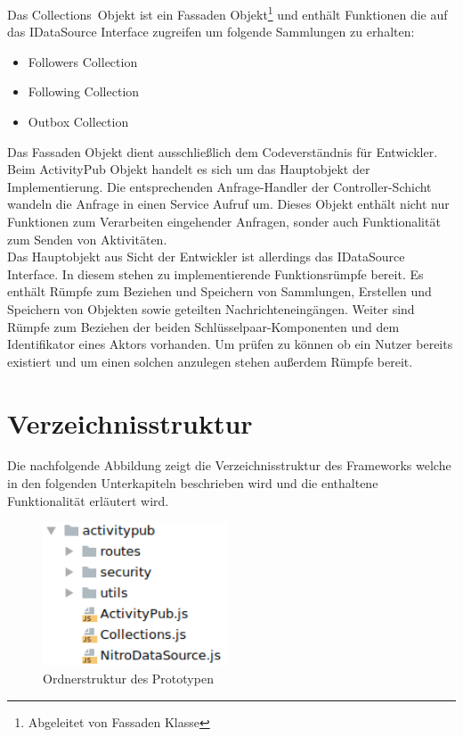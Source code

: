 Das \glqq Collections\grqq~Objekt ist ein Fassaden Objekt\footnote{Abgeleitet von Fassaden Klasse} und enthält Funktionen die auf das IDataSource Interface zugreifen um folgende Sammlungen zu erhalten:
\begin{itemize}
	\item Followers Collection
	\item Following Collection
	\item Outbox Collection
\end{itemize} 
Das Fassaden Objekt dient ausschließlich dem Codeverständnis für Entwickler.\\

Beim ActivityPub Objekt handelt es sich um das Hauptobjekt der Implementierung. Die entsprechenden Anfrage-Handler der Controller-Schicht wandeln die Anfrage in einen Service Aufruf um. Dieses Objekt enthält nicht nur Funktionen zum Verarbeiten eingehender Anfragen, sonder auch Funktionalität zum Senden von Aktivitäten.\\

Das Hauptobjekt aus Sicht der Entwickler ist allerdings das IDataSource Interface. In diesem stehen zu implementierende Funktionsrümpfe bereit. Es enthält Rümpfe zum Beziehen und Speichern von Sammlungen, Erstellen und Speichern von Objekten sowie geteilten Nachrichteneingängen. Weiter sind Rümpfe zum Beziehen der beiden Schlüsselpaar-Komponenten und dem Identifikator eines Aktors vorhanden. Um prüfen zu können ob ein Nutzer bereits existiert und um einen solchen anzulegen stehen außerdem Rümpfe bereit.

\section{Verzeichnisstruktur}
Die nachfolgende Abbildung zeigt die Verzeichnisstruktur des Frameworks welche in den folgenden Unterkapiteln beschrieben wird und die enthaltene Funktionalität erläutert wird.
\begin{figure}[h]
	\centering
	\includegraphics[width=5.5cm]{figures/activitypub-directory-structur.png}
	\caption{Ordnerstruktur des Prototypen}
	\label{fig:directory-structur}
\end{figure}
